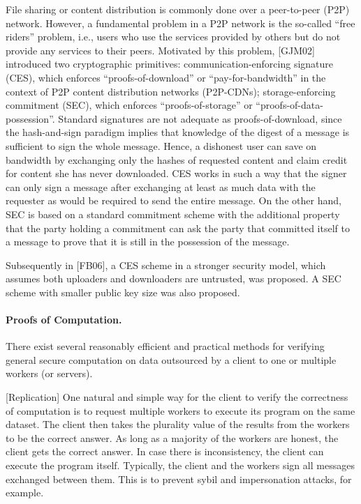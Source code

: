 File sharing or content distribution is commonly done over a peer-to-peer (P2P) network. However, a fundamental problem in a P2P network is the so-called ``free riders'' problem, i.e., users who use the services provided by others but do not provide any services to their peers. Motivated by this problem, [GJM02] introduced two cryptographic primitives:
communication-enforcing signature (CES), which enforces ``proofs-of-download'' or ``pay-for-bandwidth'' in the context of P2P content distribution networks (P2P-CDNs);
storage-enforcing commitment (SEC), which enforces ``proofs-of-storage'' or ``proofs-of-data-possession''.
Standard signatures are not adequate as proofs-of-download, since the hash-and-sign paradigm implies that knowledge of the digest of a message is sufficient to sign the whole message. Hence, a dishonest user can save on bandwidth by exchanging only the hashes of requested content and claim credit for content she has never downloaded. CES works in such a way that the signer can only sign a message after exchanging at least as much data with the requester as would be required to send the entire message. On the other hand, SEC is based on a standard commitment scheme with the additional property that the party holding a commitment can ask the party that committed itself to a message to prove that it is still in the possession of the message.

Subsequently in [FB06], a CES scheme in a stronger security model, which assumes both uploaders and downloaders are untrusted, was proposed. A SEC scheme with smaller public key size was also proposed.


\paragraph{Proofs of Computation.}
There exist several reasonably efficient and practical methods for verifying general secure computation on data outsourced by a client to one or multiple workers (or servers).

[Replication]
One natural and simple way for the client to verify the correctness of computation is to request multiple workers to execute its program on the same dataset. The client then takes the plurality value of the results from the workers to be the correct answer. As long as a majority of the workers are honest, the client gets the correct answer. In case there is inconsistency, the client can execute the program itself. Typically, the client and the workers sign all messages exchanged between them. This is to prevent sybil and impersonation attacks, for example.

